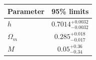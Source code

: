 \begin{tabular} { l  c}

 Parameter &  95\% limits\\
\hline
{\boldmath$h              $} & $0.7014^{+0.0032}_{-0.0032}$\\

{\boldmath$Ω_m            $} & $0.285^{+0.018}_{-0.017}   $\\

{\boldmath$M              $} & $0.05^{+0.36}_{-0.34}      $\\
\hline
\end{tabular}